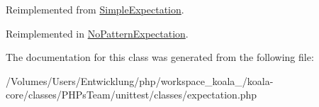Reimplemented from \hyperlink{class_simple_expectation_a15b69edf659c76f6543aa98d8d85b025}{SimpleExpectation}.



Reimplemented in \hyperlink{class_no_pattern_expectation_a214eefe693fa189648ee4e51d38ed7b2}{NoPatternExpectation}.



The documentation for this class was generated from the following file:\begin{DoxyCompactItemize}
\item 
/Volumes/Users/Entwicklung/php/workspace\_\-koala\_/koala-\/core/classes/PHPsTeam/unittest/classes/expectation.php\end{DoxyCompactItemize}
